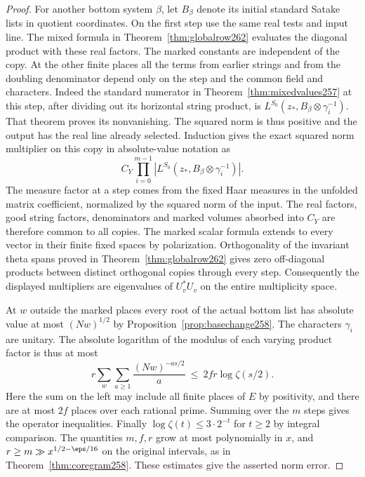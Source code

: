 \documentclass[a4paper,11pt]{article}
\theoremstyle{definition}
\theoremstyle{remark}
\numberwithin{equation}{section}
\begin{document}
\begin{proof}
For another bottom system \(\beta\), let \(B_\beta\) denote its
initial standard Satake lists in quotient coordinates. On the
first step use the same real tests and input line. The mixed
formula in Theorem~\ref{thm:globalrow262} evaluates the
diagonal product with these real factors. The marked constants
are independent of the copy. At the other finite places all the
terms from earlier strings and from the doubling denominator
depend only on the step and the common field and characters.
Indeed the standard numerator in Theorem~\ref{thm:mixedvalues257}
at this step, after dividing out its horizontal string product,
is \(L^{S_0}(z_*,B_\beta\otimes\gamma_i^{-1})\).
That theorem proves its nonvanishing. The squared norm is thus
positive and the output has the real line already selected.
Induction gives the exact squared norm multiplier on this copy
in absolute-value notation as
\[
          C_Y\prod_{i=0}^{m-1}
             \left|L^{S_0}(z_*,B_\beta\otimes\gamma_i^{-1})\right|.
\]
The measure factor at a step comes from the fixed Haar measures
in the unfolded matrix coefficient, normalized by the squared
norm of the input. The real factors, good string factors,
denominators and marked volumes absorbed into \(C_Y\) are
therefore common to all copies. The marked scalar formula
extends to every vector in their finite fixed spaces by
polarization. Orthogonality of the invariant theta spans proved
in Theorem~\ref{thm:globalrow262} gives zero off-diagonal
products between distinct orthogonal copies through every
step. Consequently the displayed multipliers are eigenvalues
of \(U_v^*U_v\) on the entire multiplicity space.

At \(w\) outside the marked places every root of the actual
bottom list has absolute value at most \((Nw)^{1/2}\) by
Proposition~\ref{prop:basechange258}. The characters
\(\gamma_i\) are unitary. The absolute logarithm of the modulus
of each varying product factor is thus at most
\[
 r\sum_{w}\sum_{a\ge1}\frac{(Nw)^{-as/2}}{a}
          \ \le\ 2fr\log\zeta(s/2).
\]
Here the sum on the left may include all finite places of \(E\)
by positivity, and there are at most \(2f\) places over each
rational prime. Summing over the \(m\) steps gives the operator
inequalities. Finally \(\log\zeta(t)\le3\cdot2^{-t}\) for
\(t\ge2\) by integral comparison. The quantities \(m,f,r\) grow
at most polynomially in \(x\), and \(r\ge m\gg
x^{1/2-\eps/16}\) on the original intervals, as in
Theorem~\ref{thm:coregram258}. These estimates give the
asserted norm error.
\end{proof}
\end{document}
